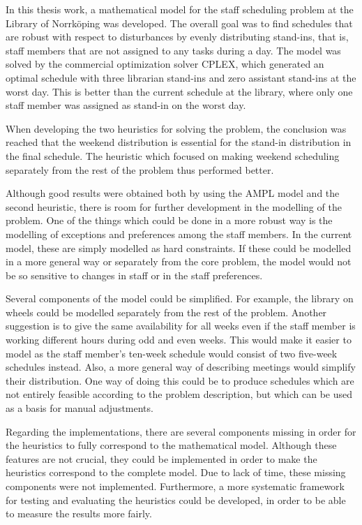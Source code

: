 In this thesis work, a mathematical model for the staff scheduling problem at the Library of Norrköping was developed. The overall goal was to find schedules that are robust with respect to disturbances by evenly distributing stand-ins, that is, staff members that are not assigned to any tasks during a day. The model was solved by the commercial optimization solver CPLEX, which generated an optimal schedule with three librarian stand-ins and zero assistant stand-ins at the worst day. This is better than the current schedule at the library, where only one staff member was assigned as stand-in on the worst day.

When developing the two heuristics for solving the problem, the conclusion was reached that the weekend distribution is essential for the stand-in distribution in the final schedule. The heuristic which focused on making weekend scheduling separately from the rest of the problem thus performed better. 

Although good results were obtained both by using the AMPL model and the second heuristic, there is room for further development in the modelling of the problem. One of the things which could be done in a more robust way is the modelling of exceptions and preferences among the staff members. In the current model, these are simply modelled as hard constraints. If these could be modelled in a more general way or separately from the core problem, the model would not be so sensitive to changes in staff or in the staff preferences.

Several components of the model could be simplified. For example, the library on wheels could be modelled separately from the rest of the problem. Another suggestion is to give the same availability for all weeks even if the staff member is working different hours during odd and even weeks. This would make it easier to model as the staff member's ten-week schedule would consist of two five-week schedules instead. Also, a more general way of describing meetings would simplify their distribution. One way of doing this could be to produce schedules which are not entirely feasible according to the problem description, but which can be used as a basis for manual adjustments.

Regarding the implementations, there are several components missing in order for the heuristics to fully correspond to the mathematical model. Although these features are not crucial, they could be implemented in order to make the heuristics correspond to the complete model. Due to lack of time, these missing components were not implemented. Furthermore, a more systematic framework for testing and evaluating the heuristics could be developed, in order to be able to measure the results more fairly.



